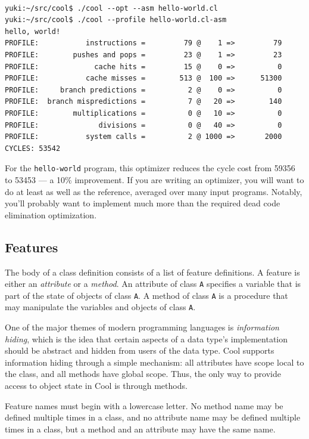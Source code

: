 \documentclass[]{article}
\begin{document}
\begin{verbatim}
 
yuki:~/src/cool$ ./cool --opt --asm hello-world.cl
yuki:~/src/cool$ ./cool --profile hello-world.cl-asm 
hello, world!
PROFILE:           instructions =         79 @    1 =>         79
PROFILE:        pushes and pops =         23 @    1 =>         23
PROFILE:             cache hits =         15 @    0 =>          0
PROFILE:           cache misses =        513 @  100 =>      51300
PROFILE:     branch predictions =          2 @    0 =>          0
PROFILE:  branch mispredictions =          7 @   20 =>        140
PROFILE:        multiplications =          0 @   10 =>          0
PROFILE:              divisions =          0 @   40 =>          0
PROFILE:           system calls =          2 @ 1000 =>       2000
CYCLES: 53542
\end{verbatim}

For the \texttt{hello-world} program, this optimizer reduces the cycle
cost from 59356 to 53453 --- a 10\% improvement. If you are writing an
optimizer, you will want to do at least as well as the reference,
averaged over many input programs. Notably, you'll probably want to
implement much more than the required dead code elimination
optimization.

\subsection{Features}

The body of a class definition consists of a list of feature
definitions. A feature is either an \emph{attribute} or a \emph{method}.
An attribute of class \texttt{A} specifies a variable that is part of
the state of objects of class \texttt{A}. A method of class \texttt{A}
is a procedure that may manipulate the variables and objects of class
\texttt{A}.

One of the major themes of modern programming languages is
\emph{information hiding}, which is the idea that certain aspects of a
data type's implementation should be abstract and hidden from users of
the data type. Cool supports information hiding through a simple
mechanism: all attributes have scope local to the class, and all methods
have global scope. Thus, the only way to provide access to object state
in Cool is through methods.

Feature names must begin with a lowercase letter. No method name may be
defined multiple times in a class, and no attribute name may be defined
multiple times in a class, but a method and an attribute may have the
same name.
\end{document}
